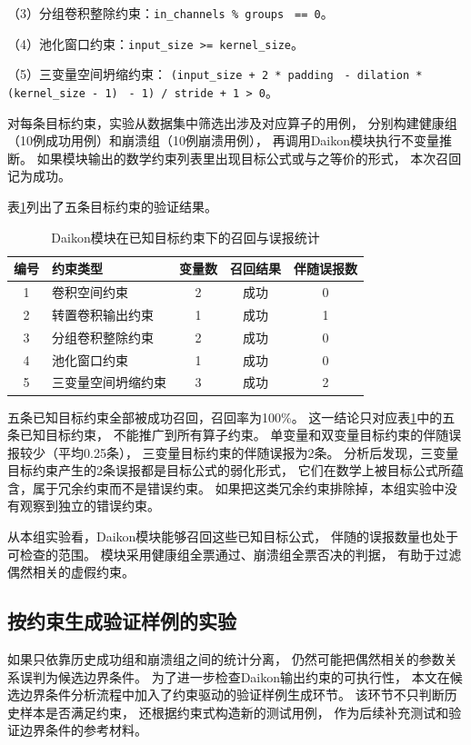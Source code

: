 （3）分组卷积整除约束：\texttt{in\_channels \% groups}%
\allowbreak\texttt{ == 0}。

（4）池化窗口约束：\texttt{input\_size >= kernel\_size}。

（5）三变量空间坍缩约束：
\texttt{(input\_size + 2 * padding}%
\allowbreak\texttt{ - dilation * (kernel\_size - 1)}%
\allowbreak\texttt{ - 1) / stride + 1 > 0}。

对每条目标约束，实验从数据集中筛选出涉及对应算子的用例，
分别构建健康组（10例成功用例）和崩溃组（10例崩溃用例），
再调用Daikon模块执行不变量推断。
如果模块输出的数学约束列表里出现目标公式或与之等价的形式，
本次召回记为成功。

表\ref{tab:daikon_known}列出了五条目标约束的验证结果。

\begin{table}[htbp]
\centering
\caption{Daikon模块在已知目标约束下的召回与误报统计}
\label{tab:daikon_known}
\begin{tabular}{clccc}
\toprule
编号 & 约束类型 & 变量数 & 召回结果 & 伴随误报数 \\
\midrule
1 & 卷积空间约束 & 2 & 成功 & 0 \\
2 & 转置卷积输出约束 & 1 & 成功 & 1 \\
3 & 分组卷积整除约束 & 2 & 成功 & 0 \\
4 & 池化窗口约束 & 1 & 成功 & 0 \\
5 & 三变量空间坍缩约束 & 3 & 成功 & 2 \\
\bottomrule
\end{tabular}
\end{table}

五条已知目标约束全部被成功召回，召回率为100\%。
这一结论只对应表\ref{tab:daikon_known}中的五条已知目标约束，
不能推广到所有算子约束。
单变量和双变量目标约束的伴随误报较少（平均0.25条），
三变量目标约束的伴随误报为2条。
分析后发现，三变量目标约束产生的2条误报都是目标公式的弱化形式，
它们在数学上被目标公式所蕴含，属于冗余约束而不是错误约束。
如果把这类冗余约束排除掉，本组实验中没有观察到独立的错误约束。

从本组实验看，Daikon模块能够召回这些已知目标公式，
伴随的误报数量也处于可检查的范围。
模块采用健康组全票通过、崩溃组全票否决的判据，
有助于过滤偶然相关的虚假约束。

\subsection{按约束生成验证样例的实验}

如果只依靠历史成功组和崩溃组之间的统计分离，
仍然可能把偶然相关的参数关系误判为候选边界条件。
为了进一步检查Daikon输出约束的可执行性，
本文在候选边界条件分析流程中加入了约束驱动的验证样例生成环节。
该环节不只判断历史样本是否满足约束，
还根据约束式构造新的测试用例，
作为后续补充测试和验证边界条件的参考材料。

